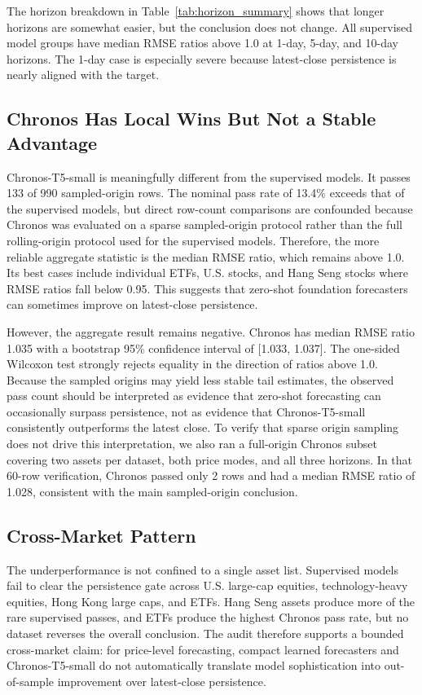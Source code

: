 \documentclass[11pt]{article}
\begin{document}
The horizon breakdown in Table~\ref{tab:horizon_summary} shows that longer horizons are somewhat easier, but the conclusion does not change. All supervised model groups have median RMSE ratios above 1.0 at 1-day, 5-day, and 10-day horizons. The 1-day case is especially severe because latest-close persistence is nearly aligned with the target.

\subsection{Chronos Has Local Wins But Not a Stable Advantage}

Chronos-T5-small is meaningfully different from the supervised models. It passes 133 of 990 sampled-origin rows. The nominal pass rate of 13.4\% exceeds that of the supervised models, but direct row-count comparisons are confounded because Chronos was evaluated on a sparse sampled-origin protocol rather than the full rolling-origin protocol used for the supervised models. Therefore, the more reliable aggregate statistic is the median RMSE ratio, which remains above 1.0. Its best cases include individual ETFs, U.S. stocks, and Hang Seng stocks where RMSE ratios fall below 0.95. This suggests that zero-shot foundation forecasters can sometimes improve on latest-close persistence.

However, the aggregate result remains negative. Chronos has median RMSE ratio 1.035 with a bootstrap 95\% confidence interval of [1.033, 1.037]. The one-sided Wilcoxon test strongly rejects equality in the direction of ratios above 1.0. Because the sampled origins may yield less stable tail estimates, the observed pass count should be interpreted as evidence that zero-shot forecasting can occasionally surpass persistence, not as evidence that Chronos-T5-small consistently outperforms the latest close. To verify that sparse origin sampling does not drive this interpretation, we also ran a full-origin Chronos subset covering two assets per dataset, both price modes, and all three horizons. In that 60-row verification, Chronos passed only 2 rows and had a median RMSE ratio of 1.028, consistent with the main sampled-origin conclusion.

\subsection{Cross-Market Pattern}

The underperformance is not confined to a single asset list. Supervised models fail to clear the persistence gate across U.S. large-cap equities, technology-heavy equities, Hong Kong large caps, and ETFs. Hang Seng assets produce more of the rare supervised passes, and ETFs produce the highest Chronos pass rate, but no dataset reverses the overall conclusion. The audit therefore supports a bounded cross-market claim: for price-level forecasting, compact learned forecasters and Chronos-T5-small do not automatically translate model sophistication into out-of-sample improvement over latest-close persistence.
\end{document}
